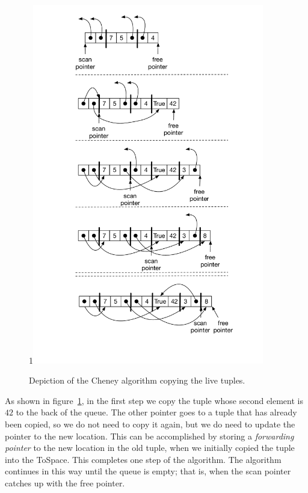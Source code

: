 \documentclass[7x10]{TimesAPriori_MIT}%
\def\pythonEd{1}
\def\edition{0}
\newcommand{\python}[1]{{\if\edition\pythonEd #1\fi}}
\numberwithin{theorem}{chapter}
\numberwithin{definition}{chapter}
\numberwithin{equation}{chapter}
\begin{document}
\begin{figure}[tbp]
\begin{tcolorbox}[colback=white]
\python{\includegraphics[width=0.9\textwidth]{figs/cheney-python}}
\end{tcolorbox}

\caption{Depiction of the Cheney algorithm copying the live tuples.}
\label{fig:cheney}
\end{figure}

As shown in figure~\ref{fig:cheney}, in the first step we copy the
tuple whose second element is $42$ to the back of the queue. The other
pointer goes to a tuple that has already been copied, so we do not
need to copy it again, but we do need to update the pointer to the new
location. This can be accomplished by storing a \emph{forwarding
pointer} to the new location in the
old tuple, when we initially copied the tuple into the
ToSpace. This completes one step of the algorithm. The algorithm
continues in this way until the queue is empty; that is, when the scan
pointer catches up with the free pointer.
\end{document}
